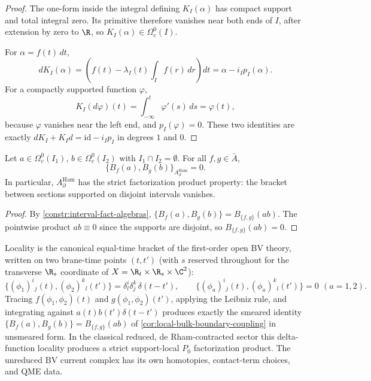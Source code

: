\documentclass[11pt]{memoir}
\begin{document}
\begin{proof}
  The one-form inside the integral defining \(K_I(\alpha)\) has compact
  support and total integral zero. Its primitive therefore vanishes near
  both ends of \(I\), after extension by zero to \(\R\), so
  \(K_I(\alpha)\in\Omega^0_c(I)\).

  For \(\alpha=f(t)\,dt\),
  \[
    dK_I(\alpha)
      =
      \left(f(t)-\lambda_I(t)\int_I f(r)\,dr\right)dt
      =
      \alpha-i_Ip_I(\alpha).
  \]
  For a compactly supported function \(\varphi\),
  \[
    K_I(d\varphi)(t)=\int_{-\infty}^{t}\varphi'(s)\,ds=\varphi(t),
  \]
  because \(\varphi\) vanishes near the left end, and \(p_I(\varphi)=0\).
  These two identities are exactly
  \(dK_I+K_I d=\mathrm{id}-i_Ip_I\) in degrees \(1\) and \(0\).
\end{proof}

\begin{prop}\label{prop:brane-bracket-locality}
  Let $a\in\Omega^0_c(I_1)$, $b\in\Omega^0_c(I_2)$ with
  $I_1\cap I_2=\emptyset$. For all $f,g\in\bar A$,
  $$\{B_f(a),B_g(b)\}_{A_\partial^{\mathrm{Ham}}}=0.$$
  In particular, $A_\partial^{\mathrm{Ham}}$ has the strict
  factorization product property: the bracket between sections
  supported on disjoint intervals vanishes.
\end{prop}

\begin{proof}
  By \ref{constr:interval-fact-algebras},
  $\{B_f(a),B_g(b)\}=B_{\{f,g\}}(ab)$. The pointwise product
  $ab\equiv 0$ since the supports are disjoint, so
  $B_{\{f,g\}}(ab)=0$.
\end{proof}

\begin{rmk}\label{rmk:equal-time-locality}
  Locality is the canonical equal-time bracket of the
  first-order open BV theory, written on two brane-time points
  \((t,t')\) (with \(s\) reserved throughout for the transverse
  \(\R_s\) coordinate of \(X=\R_t\times\R_s\times\C^2\)):
  $$\{(\phi_1)^i{}_j(t),(\phi_2)^k{}_l(t')\}
    =\delta^i_l\delta^k_j\,\delta(t-t'),\qquad
    \{(\phi_a)^i{}_j(t),(\phi_a)^k{}_l(t')\}=0\ \,(a=1,2).$$
  Tracing $f(\phi_1,\phi_2)(t)$ and $g(\phi_1,\phi_2)(t')$, applying the
  Leibniz rule, and integrating against $a(t)b(t')\delta(t-t')$ produces
  exactly the smeared identity
  $\{B_f(a),B_g(b)\}=B_{\{f,g\}}(ab)$ of
  \ref{cor:local-bulk-boundary-coupling} in unsmeared form.  In the
  classical reduced, de Rham-contracted sector this delta-function
  locality produces a strict support-local \(P_0\) factorization product.
  The unreduced BV current complex has its own homotopies,
  contact-term choices, and QME data.
\end{rmk}
\end{document}
